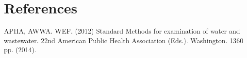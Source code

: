 \documentclass[12pt]{../SOP3}\usepackage[]{graphicx}\usepackage[]{color}
\begin{document}
\section{References}

\NP APHA, AWWA. WEF. (2012) Standard Methods for examination of water and wastewater. 22nd American Public Health Association (Eds.). Washington. 1360 pp. (2014).
\end{document}
